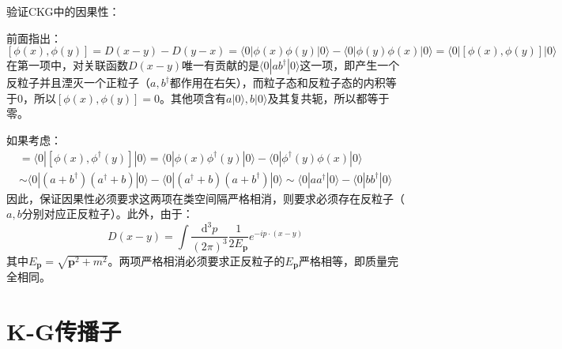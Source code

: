 \documentclass{book}
\begin{document}
验证CKG中的因果性：

前面指出：
$$
[\phi(x),\phi(y)]=D(x-y)-D(y-x)=\langle0|\phi(x)\phi(y)|0\rangle-\langle0|\phi(y)\phi(x)|0\rangle=\langle 0|[\phi(x),\phi(y)]|0\rangle
$$
在第一项中，对关联函数$D(x-y)$唯一有贡献的是$\langle0|ab^\dagger|0\rangle$这一项，即产生一个反粒子并且湮灭一个正粒子（$a,b^\dagger$都作用在右矢），而粒子态和反粒子态的内积等于$0$，所以$[\phi(x),\phi(y)]=0$。其他项含有$a|0\rangle,b|0\rangle$及其复共轭，所以都等于零。

如果考虑：
\begin{gather*}
[\phi(x),\phi^\dagger(y)]=\langle 0|[\phi(x),\phi^\dagger(y)]|0\rangle=\langle 0|\phi(x)\phi^\dagger(y)|0\rangle-\langle 0|\phi^\dagger(y)\phi(x)|0\rangle\\\sim\langle 0|(a+b^\dagger)(a^\dagger+b)|0\rangle-\langle 0|(a^\dagger+b)(a+b^\dagger)|0\rangle\sim\langle0|aa^\dagger|0\rangle-\langle0|bb^\dagger|0\rangle
\end{gather*}
因此，保证因果性必须要求这两项在类空间隔严格相消，则要求必须存在反粒子（$a,b$分别对应正反粒子）。此外，由于：
$$
D(x-y)={\int\frac{\mathrm{d}^3p}{(2\pi)^3}\frac1{2E_{\mathbf{p}}}e^{-ip\cdot(x-y)}}
$$
其中$E_\mathbf{p}=\sqrt{\mathbf{p}^2+m^2}$。两项严格相消必须要求正反粒子的$E_\mathbf p$严格相等，即质量完全相同。
\section{K-G传播子}
\end{document}
